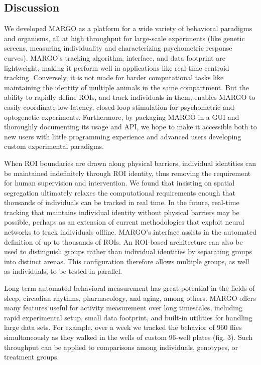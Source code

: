 \documentclass[10pt]{article}
\begin{document}
\begin{multicols}{2}
\section*{Discussion}

We developed MARGO as a platform for a wide variety of behavioral paradigms and organisms, all at high throughput for large-scale experiments (like genetic screens, measuring individuality and characterizing psychometric response curves). MARGO's tracking algorithm, interface, and data footprint are lightweight, making it perform well in applications like real-time centroid tracking. Conversely, it is not made for harder computational tasks like maintaining the identity of multiple animals in the same compartment. But the ability to rapidly define ROIs, and track individuals in them, enables MARGO to easily coordinate low-latency, closed-loop stimulation for psychometric and optogenetic experiments. Furthermore, by packaging MARGO in a GUI and thoroughly documenting its usage and API, we hope to make it accessible both to new users with little programming experience and advanced users developing custom experimental paradigms.

When ROI boundaries are drawn along physical barriers, individual identities can be maintained indefinitely through ROI identity, thus removing the requirement for human supervision and intervention. We found that insisting on spatial segregation ultimately relaxes the computational requirements enough that thousands of individuals can be tracked in real time. In the future, real-time tracking that maintains individual identity without physical barriers may be possible, perhaps as an extension of current methodologies that exploit neural networks to track individuals offline\cite{romero-ferrero_2019,schneider_2018}. MARGO's interface assists in the automated definition of up to thousands of ROIs. An ROI-based architecture can also be used to distinguish groups rather than individual identities by separating groups into distinct arenas. This configuration therefore allows multiple groups, as well as individuals, to be tested in parallel.

Long-term automated behavioral measurement has great potential in the fields of sleep, circadian rhythms, pharmacology, and aging, among others. MARGO offers many features useful for activity measurement over long timescales, including rapid experimental setup, small data footprint, and built-in utilities for handling large data sets. For example, over a week we tracked the behavior of 960 flies simultaneously as they walked in the wells of custom 96-well plates (fig. 3). Such throughput can be applied to comparisons among individuals, genotypes, or treatment groups. 


\end{multicols}
\end{document}

